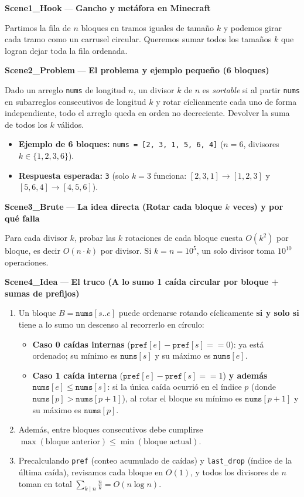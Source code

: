 \documentclass[letterpaper,10pt]{article}
\newcommand{\scene}[2]{\noindent\textbf{\textcolor{mcaqua}{#1}} --- \textbf{#2}\par\vspace{1pt}}
\begin{document}
\begin{shaded}
\scene{Scene1\_Hook}{Gancho y met\'afora en Minecraft}
Partimos la fila de $n$ bloques en tramos iguales de tama\~no $k$ y podemos girar cada tramo como un carrusel circular. Queremos sumar todos los tama\~nos $k$ que logran dejar toda la fila ordenada.

\scene{Scene2\_Problem}{El problema y ejemplo peque\~no (6 bloques)}
Dado un arreglo \texttt{nums} de longitud $n$, un divisor $k$ de $n$ es \textit{sortable} si al partir \texttt{nums} en subarreglos consecutivos de longitud $k$ y rotar c\'iclicamente cada uno de forma independiente, todo el arreglo queda en orden no decreciente. Devolver la suma de todos los $k$ v\'alidos.
\begin{itemize}\setlength{\itemsep}{1pt}
  \item \textbf{Ejemplo de 6 bloques:} \texttt{nums = [2, 3, 1, 5, 6, 4]} ($n = 6$, divisores $k \in \{1, 2, 3, 6\}$).
  \item \textbf{Respuesta esperada:} \texttt{3} (solo $k = 3$ funciona: $[2,3,1] \to [1,2,3]$ y $[5,6,4] \to [4,5,6]$).
\end{itemize}

\scene{Scene3\_Brute}{La idea directa (Rotar cada bloque $k$ veces) y por qu\'e falla}
Para cada divisor $k$, probar las $k$ rotaciones de cada bloque cuesta $O(k^2)$ por bloque, es decir $O(n \cdot k)$ por divisor. Si $k = n = 10^5$, un solo divisor toma $10^{10}$ operaciones.

\scene{Scene4\_Idea}{El truco (A lo sumo 1 ca\'ida circular por bloque + sumas de prefijos)}
\begin{enumerate}\setlength{\itemsep}{1pt}
  \item Un bloque $B = \texttt{nums}[s..e]$ puede ordenarse rotando c\'iclicamente \textbf{si y solo si} tiene a lo sumo un descenso al recorrerlo en c\'irculo:
  \begin{itemize}\setlength{\itemsep}{1pt}
    \item \textbf{Caso 0 ca\'idas internas} ($\texttt{pref}[e] - \texttt{pref}[s] == 0$): ya est\'a ordenado; su m\'inimo es $\texttt{nums}[s]$ y su m\'aximo es $\texttt{nums}[e]$.
    \item \textbf{Caso 1 ca\'ida interna} ($\texttt{pref}[e] - \texttt{pref}[s] == 1$) \textbf{y adem\'as} $\texttt{nums}[e] \le \texttt{nums}[s]$: si la \'unica ca\'ida ocurri\'o en el \'indice $p$ (donde $\texttt{nums}[p] > \texttt{nums}[p+1]$), al rotar el bloque su m\'inimo es $\texttt{nums}[p+1]$ y su m\'aximo es $\texttt{nums}[p]$.
  \end{itemize}
  \item Adem\'as, entre bloques consecutivos debe cumplirse $\max(\text{bloque anterior}) \le \min(\text{bloque actual})$.
  \item Precalculando \texttt{pref} (conteo acumulado de ca\'idas) y \texttt{last\_drop} (\'indice de la \'ultima ca\'ida), revisamos cada bloque en $O(1)$, y todos los divisores de $n$ toman en total $\sum_{k \mid n} \frac{n}{k} = O(n \log n)$.
\end{enumerate}


\end{shaded}
\end{document}
